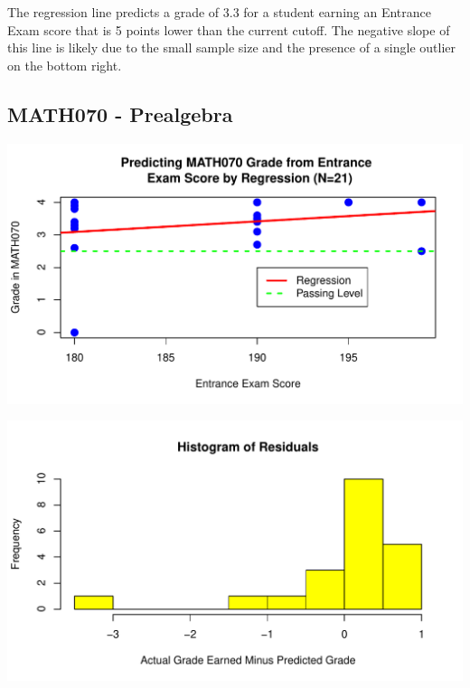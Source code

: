 \documentclass[twoside]{article}\usepackage[]{graphicx}\usepackage[]{color}
\makeatletter
\def\maxwidth{ %
  \ifdim\Gin@nat@width>\linewidth
    \linewidth
  \else
    \Gin@nat@width
  \fi
}
\newenvironment{knitrout}{}{} %
\makeatother
\begin{document}

The regression line predicts a grade of 3.3 for a student earning an Entrance Exam score that is 5 points lower than the current cutoff.  The negative slope of this line is likely due to the small sample size and the presence of a single outlier on the bottom right.


\newpage
\subsection{MATH070 - Prealgebra}


\begin{knitrout}
\color{fgcolor}
\includegraphics[width=\maxwidth]{figure/070regressiongraph-1} 

\end{knitrout}

\begin{knitrout}
\color{fgcolor}
\includegraphics[width=\maxwidth]{figure/070residualsplot-1} 

\end{knitrout}
\end{document}
